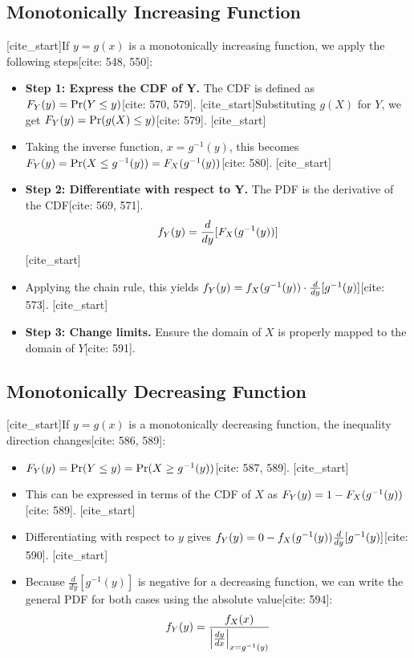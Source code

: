 \documentclass[11pt]{article}
\begin{document}
\subsection{Monotonically Increasing Function}
[cite_start]If $y = g(x)$ is a monotonically increasing function, we apply the following steps[cite: 548, 550]:
\begin{itemize}
    [cite_start]\item \leavevmode \textbf{Step 1: Express the CDF of Y.} The CDF is defined as $F\sb{Y}(y) = \Pr(Y \le y)$[cite: 570, 579]. [cite_start]Substituting $g(X)$ for $Y$, we get $F\sb{Y}(y) = \Pr(g(X) \le y)$[cite: 579].
    [cite_start]\item \leavevmode Taking the inverse function, $x = g^{-1}(y)$, this becomes $F\sb{Y}(y) = \Pr(X \le g^{-1}(y)) = F\sb{X}(g^{-1}(y))$[cite: 580].
    [cite_start]\item \leavevmode \textbf{Step 2: Differentiate with respect to Y.} The PDF is the derivative of the CDF[cite: 569, 571].
    $$f\sb{Y}(y) = \frac{d}{dy}[F\sb{X}(g^{-1}(y))]$$
    [cite_start]\item \leavevmode Applying the chain rule, this yields $f\sb{Y}(y) = f\sb{X}(g^{-1}(y)) \cdot \frac{d}{dy}[g^{-1}(y)]$[cite: 573].
    [cite_start]\item \leavevmode \textbf{Step 3: Change limits.} Ensure the domain of $X$ is properly mapped to the domain of $Y$[cite: 591].
\end{itemize}

\subsection{Monotonically Decreasing Function}
[cite_start]If $y = g(x)$ is a monotonically decreasing function, the inequality direction changes[cite: 586, 589]:
\begin{itemize}
    [cite_start]\item \leavevmode $F\sb{Y}(y) = \Pr(Y \le y) = \Pr(X \ge g^{-1}(y))$[cite: 587, 589].
    [cite_start]\item \leavevmode This can be expressed in terms of the CDF of $X$ as $F\sb{Y}(y) = 1 - F\sb{X}(g^{-1}(y))$[cite: 589].
    [cite_start]\item \leavevmode Differentiating with respect to $y$ gives $f\sb{Y}(y) = 0 - f\sb{X}(g^{-1}(y)) \frac{d}{dy}[g^{-1}(y)]$[cite: 590].
    [cite_start]\item \leavevmode Because $\frac{d}{dy}[g^{-1}(y)]$ is negative for a decreasing function, we can write the general PDF for both cases using the absolute value[cite: 594]:
    $$f\sb{Y}(y) = \frac{f\sb{X}(x)}{\left| \frac{dy}{dx} \right|\sb{x=g^{-1}(y)}}$$
\end{itemize}
\end{document}
